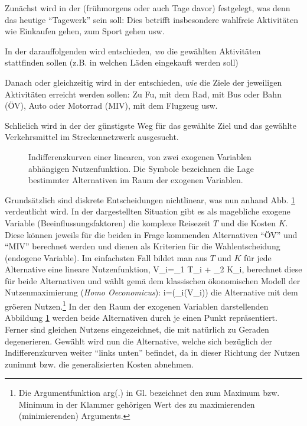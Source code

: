 \bi
\item Zun\"achst wird in der  (fr\"uhmorgens
oder auch Tage davor) festgelegt, was denn das heutige ``Tagewerk''
sein soll: Dies betrifft insbesondere wahlfreie Aktivit\"aten wie
Einkaufen gehen, zum Sport gehen usw.
\item In der darauffolgenden  wird entschieden,
\textit{wo} die gew\"ahlten Aktivit\"aten stattfinden sollen
(z.B. in welchen L\"aden eingekauft werden soll) 
\item Danach oder gleichzeitig wird in der 
entschieden, \textit{wie} die Ziele der jeweiligen Aktivit\"aten
erreicht werden sollen: Zu Fu\3, mit dem Rad, mit Bus oder Bahn (\"OV), 
Auto oder Motorrad (MIV), mit dem Flugzeug usw. 
\item Schlie\3lich wird in der  der g\"unstigste
Weg f\"ur das gew\"ahlte Ziel und das gew\"ahlte Verkehrsmittel 
im Streckennetzwerk ausgesucht.
\ei
%
\begin{figure}[t!]
\caption{\label{fig:zweiAlternat-U}Indifferenzkurven einer linearen,
von zwei exogenen Variablen abh\"angigen Nutzenfunktion. Die Symbole
bezeichnen die Lage bestimmter Alternativen im Raum der exogenen
Variablen.
}
\end{figure}
%
Grunds\"atzlich sind diskrete Entscheidungen nichtlinear, was nun 
anhand Abb. \ref{fig:zweiAlternat-U} verdeutlicht wird. In der
dargestellten Situation gibt es als ma\3gebliche  exogene Variable
(Beeinflussungsfaktoren) die komplexe
Reisezeit $T$ und die Kosten $K$. Diese k\"onnen jeweils 
 f\"ur die beiden in Frage kommenden
Alternativen ``\"OV'' und ``MIV'' berechnet werden und dienen als
Kriterien f\"ur die Wahlentscheidung (endogene Variable). 
Im einfachsten Fall bildet man aus $T$ und $K$ f\"ur jede Alternative eine lineare
Nutzenfunktion, 
\be
\label{Vlin}
V_i=\beta_1 T_i + \beta_2 K_i,
\ee
berechnet diese  f\"ur beide Alternativen und w\"ahlt 
 gem\"a\3 dem klassischen \"okonomischen Modell der Nutzenmaximierung
(\textit{Homo Oeconomicus}):
\be
\label{igewaehlt}
i=(\max_i(V_i))
\ee
die Alternative mit dem gr\"o\3eren Nutzen.\footnote{Die
Argumentfunktion arg(.) in Gl. \protect{} bezeichnet
den zum Maximum bzw. Minimum in der Klammer geh\"origen Wert des
zu maximierenden (minimierenden) Arguments.}
In der den Raum der exogenen Variablen darstellenden Abbildung
\ref{fig:zweiAlternat-U}  werden beide Alternativen durch je einen
Punkt repr\"asentiert. Ferner sind  gleichen
Nutzens eingezeichnet, die mit  nat\"urlich zu Geraden
degenerieren. Gew\"ahlt wird nun die Alternative, welche sich bez\"uglich
der Indifferenzkurven weiter ``links unten'' befindet, da in
dieser Richtung der Nutzen zunimmt bzw. die generalisierten Kosten
abnehmen.

